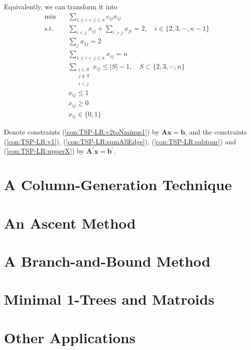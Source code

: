 			Equivalently, we can transform it into
			\begin{align}
				\min \quad & \sum_{1 \le i < j \le n}c_{ij} x_{ij}\\
				\text{s.t.} \quad & \sum_{i < j} x_{ij} + \sum_{i > j} x_{ji} = 2, \quad i \in \{2, 3, \cdots, n - 1\} \label{con:TSP-LR:v2toNminus1}\\				
								  & \sum_j x_{1j} = 2 \label{con:TSP-LR:v1}\\
								  & \sum_{1 \le i < j \le n} x_{ij} = n \label{con:TSP-LR:sumAllEdge}\\
								  & \sum_{\substack{i \in S \\ j \notin S \\ i < j}} x_{ij} \le |S| - 1, \quad S \subset \{2, 3, \cdots, n\}\label{con:TSP-LR:subtour}\\
								  & x_{ij} \le 1 \label{con:TSP-LR:upperX}\\
								  & x_{ij} \ge 0\\
								  & x_{ij} \in \{0, 1\}
			\end{align}

			Denote constraints (\ref{con:TSP-LR:v2toNminus1}) by $\mathbf{Ax} = \mathbf{b}$, and the constraints (\ref{con:TSP-LR:v1}), (\ref{con:TSP-LR:sumAllEdge}), (\ref{con:TSP-LR:subtour}) and (\ref{con:TSP-LR:upperX}) by $\mathbf{A}^\prime \mathbf{x} = \mathbf{b}^\prime$.

		\section{A Column-Generation Technique}

		\section{An Ascent Method}

		\section{A Branch-and-Bound Method}

		\section{Minimal 1-Trees and Matroids}

		\section{Other Applications}
